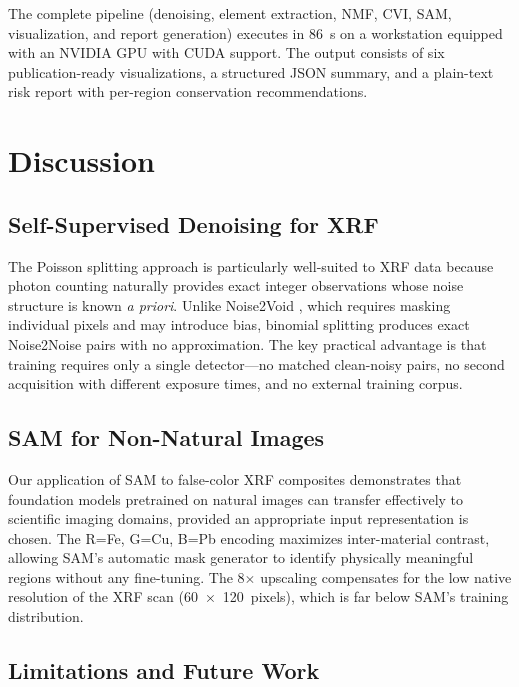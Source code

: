 \documentclass[twocolumn,11pt]{article}
\begin{document}
The complete pipeline (denoising, element extraction, NMF, CVI, SAM,
visualization, and report generation) executes in \SI{86}{\second} on a
workstation equipped with an NVIDIA GPU with CUDA support. The output
consists of six publication-ready visualizations, a structured JSON summary,
and a plain-text risk report with per-region conservation recommendations.


\section{Discussion}
\label{sec:discussion}

\subsection{Self-Supervised Denoising for XRF}

The Poisson splitting approach is particularly well-suited to XRF data
because photon counting naturally provides exact integer observations whose
noise structure is known \emph{a priori}. Unlike Noise2Void
\citep{krull2019noise2void}, which requires masking individual pixels and
may introduce bias, binomial splitting produces exact Noise2Noise pairs with
no approximation. The key practical advantage is that training requires only
a single detector---no matched clean-noisy pairs, no second acquisition with
different exposure times, and no external training corpus.

\subsection{SAM for Non-Natural Images}

Our application of SAM to false-color XRF composites demonstrates that
foundation models pretrained on natural images can transfer effectively to
scientific imaging domains, provided an appropriate input representation is
chosen. The R=Fe, G=Cu, B=Pb encoding maximizes inter-material contrast,
allowing SAM's automatic mask generator to identify physically meaningful
regions without any fine-tuning. The 8$\times$ upscaling compensates for
the low native resolution of the XRF scan (\SI{60x120}{pixels}), which is
far below SAM's training distribution.

\subsection{Limitations and Future Work}
\end{document}
